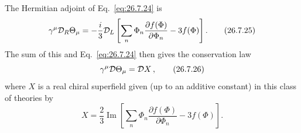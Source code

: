 The Hermitian adjoint of Eq.~\eqref{eq:26.7.24} is
\begin{equation}
  \gamma^\mu\mathcal{D}_R\Theta_\mu
  =-\frac{i}{3}\mathcal{D}_L
    \left[
      \sum_n\Phi_n\frac{\partial f(\Phi)}{\partial\Phi_n}
      -3f(\Phi)
    \right].
  \tag{26.7.25}\label{eq:26.7.25}
\end{equation}
The sum of this and Eq.~\eqref{eq:26.7.24} then gives the conservation law
\begin{equation}
  \gamma^\mu\mathcal{D}\Theta_\mu=\mathcal{D} X\,,
  \tag{26.7.26}\label{eq:26.7.26}
\end{equation}
where \(X\) is a real chiral superfield given (up to an additive constant)
in this class of theories by
\begin{equation}
  X=\frac{2}{3}\operatorname{Im}
  \left[
    \sum_n\Phi_n\frac{\partial f(\Phi)}{\partial\Phi_n}
    -3f(\Phi)
  \right].
  \tag{26.7.27}\label{eq:26.7.27}
\end{equation}

